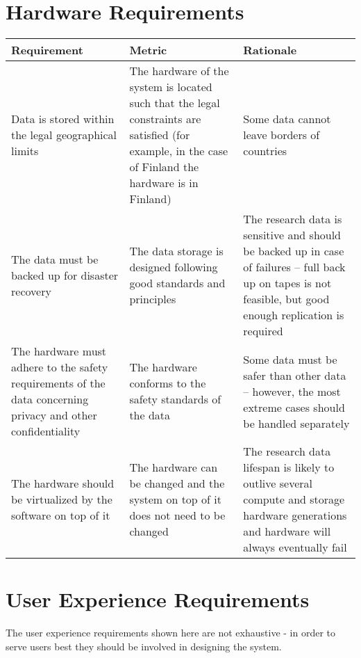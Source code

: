 \section{Hardware Requirements}

\tabcolsep=0.11cm
\begin{tabularx}{\textwidth}{| >{\raggedright}p{3cm} | >{\raggedright}p{3cm} | X |}
    \hline
    \textbf{Requirement} & \textbf{Metric}& \textbf{Rationale} \\
    \hline
    \rowcolor{Gray}
    Data is stored within the legal geographical limits &The hardware of the system is located such that the legal constraints are satisfied (for example, in the case of Finland the hardware is in Finland) & Some data cannot leave borders of countries\\
    \hline
    The data must be backed up for disaster recovery&The data storage is designed following good standards and principles &The research data is sensitive and should be backed up in case of failures – full back up on tapes is not feasible, but good enough replication is required\\
    \hline
    \rowcolor{Gray}
    The hardware must adhere to the safety requirements of the data concerning privacy and other confidentiality &The hardware conforms to the safety standards of the data&Some data must be safer than other data – however, the most extreme cases should be handled separately\\
    \hline
    The hardware should be virtualized by the software on top of it &The hardware can be changed and the system on top of it does not need to be changed & The research data lifespan is likely to outlive several compute and storage hardware generations and hardware will always eventually fail\\
    \hline
\end{tabularx}

\pagebreak

\section{User Experience Requirements}

The user experience requirements shown here are not exhaustive - in order to
serve users best they should be involved in designing the system.

